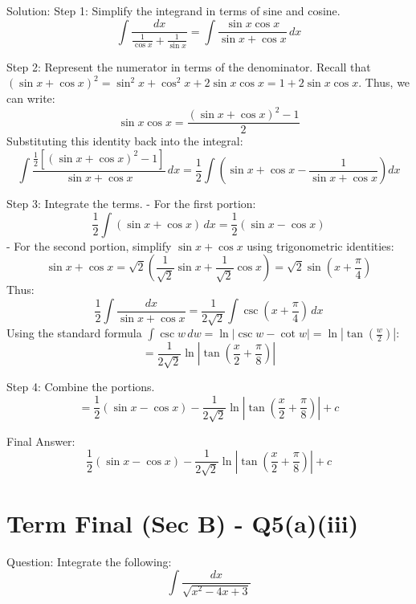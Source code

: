 \documentclass{article}
\begin{document}
Solution:
Step 1: Simplify the integrand in terms of sine and cosine.
\[
\int \frac{dx}{\frac{1}{\cos x} + \frac{1}{\sin x}} = \int \frac{\sin x \cos x}{\sin x + \cos x} \, dx
\]

Step 2: Represent the numerator in terms of the denominator.
Recall that $(\sin x + \cos x)^2 = \sin^2 x + \cos^2 x + 2\sin x \cos x = 1 + 2\sin x \cos x$.
Thus, we can write:
\[
\sin x \cos x = \frac{(\sin x + \cos x)^2 - 1}{2}
\]
Substituting this identity back into the integral:
\[
\int \frac{\frac{1}{2}\left[(\sin x + \cos x)^2 - 1\right]}{\sin x + \cos x} \, dx = \frac{1}{2} \int \left( \sin x + \cos x - \frac{1}{\sin x + \cos x} \right) dx
\]

Step 3: Integrate the terms.
- For the first portion:
  \[
  \frac{1}{2} \int (\sin x + \cos x) \, dx = \frac{1}{2} (\sin x - \cos x)
  \]
- For the second portion, simplify $\sin x + \cos x$ using trigonometric identities:
  \[
  \sin x + \cos x = \sqrt{2} \left( \frac{1}{\sqrt{2}}\sin x + \frac{1}{\sqrt{2}}\cos x \right) = \sqrt{2} \sin\left(x + \frac{\pi}{4}\right)
  \]
  Thus:
  \[
  \frac{1}{2} \int \frac{dx}{\sin x + \cos x} = \frac{1}{2\sqrt{2}} \int \csc\left(x + \frac{\pi}{4}\right) \, dx
  \]
  Using the standard formula $\int \csc w \, dw = \ln|\csc w - \cot w| = \ln\left|\tan\left(\frac{w}{2}\right)\right|$:
  \[
  = \frac{1}{2\sqrt{2}} \ln\left| \tan\left( \frac{x}{2} + \frac{\pi}{8} \right) \right|
  \]

Step 4: Combine the portions.
\[
= \frac{1}{2}(\sin x - \cos x) - \frac{1}{2\sqrt{2}} \ln\left| \tan\left( \frac{x}{2} + \frac{\pi}{8} \right) \right| + c
\]

Final Answer:
\[
\boxed{\frac{1}{2}(\sin x - \cos x) - \frac{1}{2\sqrt{2}} \ln\left| \tan\left( \frac{x}{2} + \frac{\pi}{8} \right) \right| + c}
\]

\section*{Term Final (Sec B) - Q5(a)(iii)}
Question:
Integrate the following:
\[
\int \frac{dx}{\sqrt{x^2 - 4x + 3}}
\]
\end{document}
